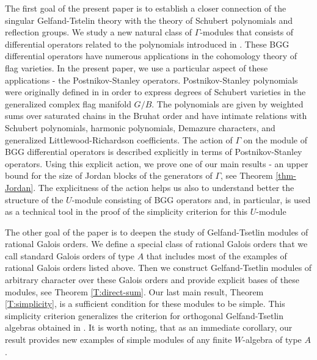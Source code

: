 \documentclass[11pt,fleqn]{amsart}
\begin{document}
The first goal of the present paper is to establish a closer connection of the singular Gelfand-Tstelin theory with the theory of  Schubert polynomials and reflection groups.  We study a new natural class of $\Gamma$-modules that consists of differential operators related to the polynomials introduced  in \cite{BGG-cohomology}. These BGG differential operators have numerous applications in the cohomology theory of flag varieties. In the present paper, we use a particular aspect of these applications - the Postnikov-Stanley operators. Postnikov-Stanley polynomials were originally defined in \cite{PS-chains-bruhat} in order to  express degrees of Schubert varieties in the generalized complex flag manifold $G/B$. The polynomials are given by weighted sums over saturated chains in the Bruhat order and have intimate relations with Schubert polynomials, harmonic polynomials, Demazure characters, and generalized Littlewood-Richardson coefficients. The action of $\Gamma$ on the module of BGG differential operators is described explicitly in terms of Postnikov-Stanley operators. Using this explicit action, we prove one of our main results -  an upper bound for the size of Jordan blocks of the generators of $\Gamma$, see Theorem \ref{thm-Jordan}. The explicitness of the action  helps us also to understand better the structure of the $U$-module consisting of BGG operators and, in particular, is used as a technical tool in the proof of the simplicity criterion for this $U$-module



The other goal of the paper is to deepen the study of Gelfand-Tsetlin  modules of  rational Galois orders. We define a special class of rational Galois orders that we call standard Galois orders of type $A$ that includes most of the examples of rational Galois orders listed above. Then we construct Gelfand-Tsetlin modules of arbitrary character over these Galois orders and provide explicit bases of these modules, see Theorem \ref{T:direct-sum}. Our last main result, Theorem \ref{T:simplicity}, is a sufficient condition for these modules to be simple. This simplicity criterion 
generalizes the criterion for orthogonal Gelfand-Tsetlin algebras obtained in \cite{EMV-orthogonal}. It is worth noting,  that as an immediate corollary, our result provides new examples of  simple modules of any finite $W$-algebra of type $A$.
\end{document}
